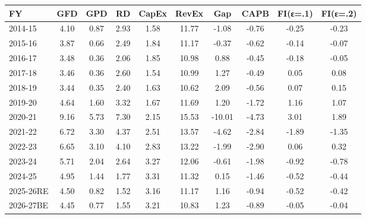 \begin{tabular}{lccccccccc}
\toprule
FY & GFD & GPD & RD & CapEx & RevEx & Gap & CAPB & FI(ε=.1) & FI(ε=.2) \\
\midrule
2014-15 & 4.10 & 0.87 & 2.93 & 1.58 & 11.77 & -1.08 & -0.76 & -0.25 & -0.23 \\
2015-16 & 3.87 & 0.66 & 2.49 & 1.84 & 11.17 & -0.37 & -0.62 & -0.14 & -0.07 \\
2016-17 & 3.48 & 0.36 & 2.06 & 1.85 & 10.98 & 0.88 & -0.45 & -0.18 & -0.05 \\
2017-18 & 3.46 & 0.36 & 2.60 & 1.54 & 10.99 & 1.27 & -0.49 & 0.05 & 0.08 \\
2018-19 & 3.44 & 0.35 & 2.40 & 1.63 & 10.62 & 2.09 & -0.56 & 0.07 & 0.15 \\
2019-20 & 4.64 & 1.60 & 3.32 & 1.67 & 11.69 & 1.20 & -1.72 & 1.16 & 1.07 \\
2020-21 & 9.16 & 5.73 & 7.30 & 2.15 & 15.53 & -10.01 & -4.73 & 3.01 & 1.89 \\
2021-22 & 6.72 & 3.30 & 4.37 & 2.51 & 13.57 & -4.62 & -2.84 & -1.89 & -1.35 \\
2022-23 & 6.65 & 3.10 & 4.10 & 2.83 & 13.22 & -1.99 & -2.90 & 0.06 & 0.32 \\
2023-24 & 5.71 & 2.04 & 2.64 & 3.27 & 12.06 & -0.61 & -1.98 & -0.92 & -0.78 \\
2024-25 & 4.95 & 1.44 & 1.77 & 3.31 & 11.32 & 0.15 & -1.46 & -0.52 & -0.44 \\
2025-26RE & 4.50 & 0.82 & 1.52 & 3.16 & 11.17 & 1.16 & -0.94 & -0.52 & -0.42 \\
2026-27BE & 4.45 & 0.77 & 1.55 & 3.21 & 10.83 & 1.23 & -0.89 & -0.05 & -0.04 \\
\bottomrule
\end{tabular}

